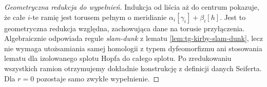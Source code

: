 \begin{proof}[Geometryczna redukcja do wypełnień]
Indukcja od liścia aż do centrum pokazuje,
że całe $i$-te ramię jest torusem pełnym
o meridianie $\alpha_i[\gamma_i]+\beta_i[h]$.
Jest to geometryczna redukcja względna, zachowująca
dane na torusie przyłączenia. Algebraicznie
odpowiada regule \emph{slam-dunk}
z lematu \ref{lem:tg-kirby-slam-dunk},
lecz nie wymaga utożsamiania samej homologii
z typem dyfeomorfizmu ani stosowania lematu
dla izolowanego splotu Hopfa do całego splotu.
Po zredukowaniu wszystkich ramion otrzymujemy
dokładnie konstrukcję z definicji danych Seiferta.
Dla $r=0$ pozostaje samo zwykłe wypełnienie.
\end{proof}

\begin{center}
\end{center}

